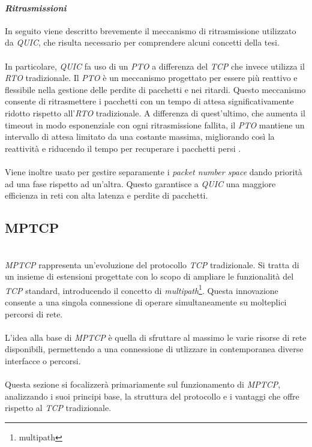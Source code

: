 \paragraph{\textit{Ritrasmissioni}}
\noindent In seguito viene descritto brevemente il meccanismo di ritrasmissione utilizzato da \emph{QUIC}, che risulta necessario per comprendere alcuni concetti della tesi.
\\\\
In particolare, \emph{QUIC} fa uso di un \emph{\gls*{PTO}{}} a differenza del \emph{TCP} che invece utilizza il \emph{RTO} tradizionale.
Il \emph{PTO} è un meccanismo progettato per essere più reattivo e flessibile nella gestione delle perdite di pacchetti e nei ritardi.
Questo meccanismo consente di ritrasmettere i pacchetti con un tempo di attesa significativamente ridotto rispetto all'\emph{RTO} tradizionale.
A differenza di quest'ultimo, che aumenta il timeout in modo esponenziale con ogni ritrasmissione fallita, il \emph{PTO} mantiene un intervallo di attesa limitato da una costante massima, migliorando così la reattività e riducendo il tempo per recuperare i pacchetti persi \cite{site:pto-quic}.
\\\\
Viene inoltre usato per gestire separamente i \emph{packet number space} dando priorità ad una fase rispetto ad un'altra. 
Questo garantisce a \emph{QUIC} una maggiore efficienza in reti con alta latenza e perdite di pacchetti.
\subsection{MPTCP}
~\\
\indent \emph{\gls*{MPTCP}} rappresenta un'evoluzione del protocollo \emph{TCP} tradizionale. 
Si tratta di un insieme di estensioni progettate con lo scopo di ampliare le funzionalità del \emph{TCP} standard,
introducendo il concetto di \emph{multipath}\footnote{\gls{multipath}}. Questa innovazione consente a una singola connessione di operare simultaneamente su molteplici percorsi di rete.
\\\\
L'idea alla base di \emph{MPTCP} è quella di sfruttare al massimo le varie risorse di rete disponibili, permettendo a una connessione di utlizzare in contemporanea diverse interfacce o percorsi.
\\\\
Questa sezione si focalizzerà primariamente sul funzionamento di \emph{MPTCP}, analizzando i suoi principi base, la struttura del protocollo e i vantaggi che offre rispetto al \emph{TCP} tradizionale. 

